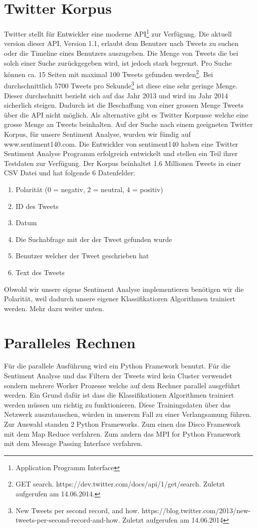 \documentclass[12pt, oneside]{report}   	%
\begin{document}
\section{Twitter Korpus}
Twitter stellt für Entwickler eine moderne API\footnote{Application Programm Interface} zur Verfügung. Die aktuell version dieser API, Version 1.1, erlaubt dem Benutzer nach Tweets zu suchen oder die Timeline eines Benutzers auszugeben. Die Menge von Tweets die bei solch einer Suche zurückgegeben wird, ist jedoch stark begrenzt. Pro Suche können ca. 15 Seiten mit maximal 100 Tweets gefunden werden\footnote{GET search. https://dev.twitter.com/docs/api/1/get/search. Zuletzt aufgerufen am 14.06.2014.}. Bei durchschnittlich 5700 Tweets pro Sekunde\footnote{New Tweets per second record, and how. https://blog.twitter.com/2013/new-tweets-per-second-record-and-how. Zuletzt aufgerufen am 14.06.2014} ist diese eine sehr geringe Menge. Dieser durchschnitt bezieht sich auf das Jahr 2013 und wird im Jahr 2014 sicherlich steigen.
Dadurch ist die Beschaffung von einer grossen Menge Tweets über die API nicht möglich. Als alternative gibt es Twitter Korpusse welche eine grosse Menge an Tweets beinhalten. 
\newline{}
Auf der Suche nach einem geeigneten Twitter Korpus, für unsere Sentiment Analyse, wurden wir fündig auf www.sentiment140.com. Die Entwickler von sentiment140 haben eine Twitter Sentiment Analyse Programm erfolgreich entwickelt und stellen ein Teil ihrer Testdaten zur Verfügung. Der Korpus beinhaltet 1.6 Millionen Tweets in einer CSV Datei und hat folgende 6 Datenfelder:
\begin{enumerate}
\item Polarität (0 = negativ, 2 = neutral, 4 = positiv)
\item ID des Tweets
\item Datum
\item Die Suchabfrage mit der der Tweet gefunden wurde
\item Benutzer welcher der Tweet geschrieben hat
\item Text des Tweets
\end{enumerate}
Obwohl wir unsere eigene Sentiment Analyse implementieren benötigen wir die Polarität, weil dadurch unsere eigener Klassifikatioren Algorithmen trainiert werden. Mehr dazu weiter unten.

\section{Paralleles Rechnen}
Für die parallele Ausführung wird ein Python Framework benutzt. Für die Sentiment Analyse und das Filtern der Tweets wird kein Cluster verwendet sondern mehrere Worker Prozesse welche auf dem Rechner parallel ausgeführt werden. Ein Grund dafür ist dass die Klassifikationen Algorithmen trainiert werden müssen um richtig zu funktionieren. Diese Trainingsdaten über das Netzwerk auszutauschen, würden in unserem Fall zu einer Verlangsamung führen. %
Zur Auswahl standen 2 Python Frameworks. Zum einen das Disco Framework mit dem Map Reduce verfahren. Zum andern das  MPI for Python Framework mit dem Message Passing Interface verfahren.
\end{document}
